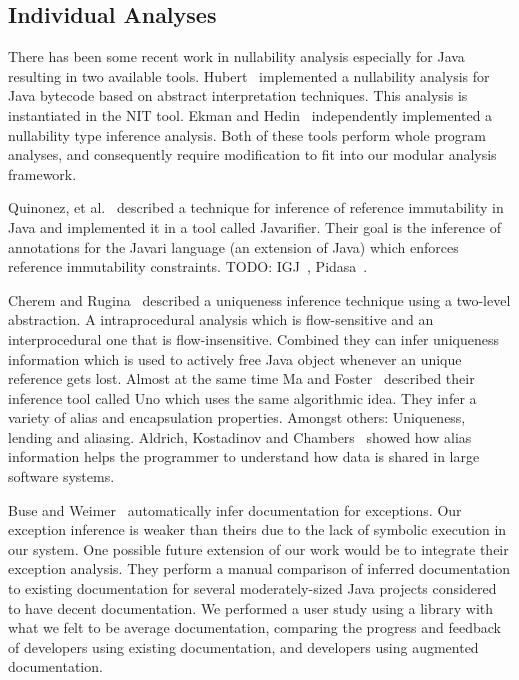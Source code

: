 \subsection{Individual Analyses}

There has been some recent work in nullability analysis especially for Java
resulting in two available tools.  Hubert~\cite{NIT} implemented a nullability
analysis for Java bytecode based on abstract interpretation techniques.  This
analysis is instantiated in the {\sc NIT} tool.  Ekman and
Hedin~\cite{NonNullTypeInference} independently implemented a nullability type
inference analysis.  Both of these tools perform whole program analyses, and
consequently require modification to fit into our modular analysis framework.

Quinonez, et al.~\cite{Javarifier} described a technique for inference of
reference immutability in Java and implemented it in a tool called {\sc
  Javarifier}. Their goal is the inference of annotations for the {\sc Javari}
language (an extension of Java) which enforces reference immutability
constraints. TODO: IGJ~\cite{IGJ}, Pidasa~\cite{Pidasa}.

Cherem and Rugina~\cite{UniquenessInference} described a uniqueness inference
technique using a two-level abstraction. A intraprocedural analysis which is
flow-sensitive and an interprocedural one that is flow-insensitive. Combined
they can infer uniqueness information which is used to actively free Java
object whenever an unique reference gets lost.  Almost at the same time Ma and
Foster~\cite{Uno} described their inference tool called Uno which uses the same
algorithmic idea. They infer a variety of alias and encapsulation
properties. Amongst others: Uniqueness, lending and aliasing.  Aldrich,
Kostadinov and Chambers~\cite{AliasJava} showed how alias information helps the
programmer to understand how data is shared in large software systems.

Buse and Weimer~\cite{autodoc} automatically infer documentation for
exceptions.  Our exception inference is weaker than theirs due to the lack of
symbolic execution in our system.  One
possible future extension of our work would be to integrate their exception
analysis.  They perform a manual comparison of inferred documentation to
existing documentation for several moderately-sized Java projects considered to
have decent documentation.  We performed a user study using a library with what
we felt to be average documentation, comparing the progress and feedback of
developers using existing documentation, and developers using augmented
documentation.
